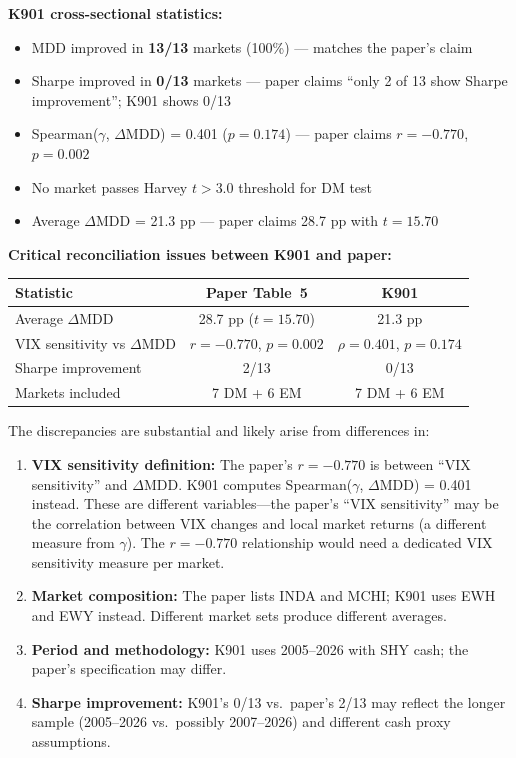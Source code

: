 \documentclass[12pt,a4paper]{article}
\begin{document}
\noindent\textbf{K901 cross-sectional statistics:}
\begin{itemize}[nosep]
\item MDD improved in \textbf{13/13} markets (100\%) --- matches the paper's claim
\item Sharpe improved in \textbf{0/13} markets --- \textcolor{highsev}{paper claims ``only 2 of 13 show Sharpe improvement''; K901 shows 0/13}
\item Spearman($\gamma$, $\Delta$MDD) = 0.401 ($p = 0.174$) --- \textcolor{highsev}{paper claims $r = -0.770$, $p = 0.002$}
\item No market passes Harvey $t > 3.0$ threshold for DM test
\item Average $\Delta$MDD = 21.3 pp --- \textcolor{highsev}{paper claims 28.7 pp with $t = 15.70$}
\end{itemize}

\medskip
\noindent\textbf{Critical reconciliation issues between K901 and paper:}

\begin{center}
\small
\begin{tabular}{lcc}
\toprule
Statistic & Paper Table~5 & K901 \\
\midrule
Average $\Delta$MDD & 28.7 pp ($t = 15.70$) & 21.3 pp \\
VIX sensitivity vs $\Delta$MDD & $r = -0.770$, $p = 0.002$ & $\rho = 0.401$, $p = 0.174$ \\
Sharpe improvement & 2/13 & 0/13 \\
Markets included & 7 DM + 6 EM & 7 DM + 6 EM \\
\bottomrule
\end{tabular}
\end{center}

The discrepancies are substantial and likely arise from differences in:
\begin{enumerate}[nosep]
\item \textbf{VIX sensitivity definition:} The paper's $r = -0.770$ is between ``VIX sensitivity'' and $\Delta$MDD. K901 computes Spearman($\gamma$, $\Delta$MDD) = 0.401 instead. These are different variables---the paper's ``VIX sensitivity'' may be the correlation between VIX changes and local market returns (a different measure from $\gamma$). The $r = -0.770$ relationship would need a dedicated VIX sensitivity measure per market.
\item \textbf{Market composition:} The paper lists INDA and MCHI; K901 uses EWH and EWY instead. Different market sets produce different averages.
\item \textbf{Period and methodology:} K901 uses 2005--2026 with SHY cash; the paper's specification may differ.
\item \textbf{Sharpe improvement:} K901's 0/13 vs.\ paper's 2/13 may reflect the longer sample (2005--2026 vs.\ possibly 2007--2026) and different cash proxy assumptions.
\end{enumerate}
\end{document}

